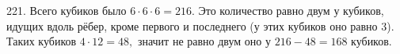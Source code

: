 221. Всего кубиков было $6\cdot6\cdot6=216.$ Это количество равно двум у кубиков, идущих вдоль рёбер, кроме первого и последнего (у этих кубиков оно равно 3).
Таких кубиков $4\cdot12=48,$ значит не равно двум оно у $216-48=168$ кубиков.\\
